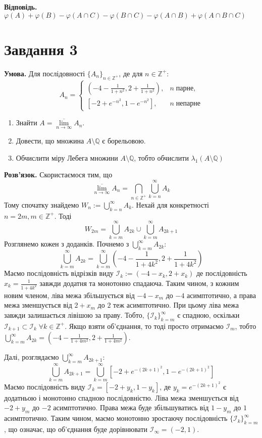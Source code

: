 \documentclass[14pt]{extarticle}
\begin{document}
\textbf{Відповідь.} $\varphi(A)+\varphi(B) - \varphi(A \cap C) - \varphi(B \cap C) - \varphi (A \cap B) + \varphi(A \cap B \cap C)$

\pagebreak

\section*{Завдання 3}

\textbf{Умова.} Для послідовності $\{A_n\}_{n \in \mathbb{Z}^+}$, де для $n \in \mathbb{Z}^+$:
\[
A_n = \begin{cases}
    \left(-4-\frac{1}{1+n^2},2+\frac{1}{1+n^2}\right),& n \; \text{парне},\\
    \left[-2+e^{-n^2},1-e^{-n^2}\right],& n \; \text{непарне}
\end{cases}
\]
\begin{enumerate}
    \item Знайти $A = \underset{n \to \infty}{\overline{\lim}} A_n$.
    \item Довести, що множина $A \setminus \mathbb{Q}$ є борельовою.
    \item Обчислити міру Лебега множини $A \setminus \mathbb{Q}$, тобто обчислити $\lambda_1(A\setminus \mathbb{Q})$
\end{enumerate}

\textbf{Розв'язок.} Скористаємося тим, що
\[
\underset{n \to \infty}{\overline{\lim}} A_n = \bigcap_{n\in\mathbb{Z}^+}\bigcup_{k=n}^{\infty}A_k
\]
Тому спочатку знайдемо $W_n := \bigcup_{k=n}^{\infty}A_k$. Нехай для конкретності $n=2m, m \in \mathbb{Z}^+$. Тоді
\[
W_{2m} = \bigcup_{k=m}^{\infty} A_{2k} \cup \bigcup_{k=m}^{\infty}A_{2k+1}
\]
Розглянемо кожен з доданків. Почнемо з $\bigcup_{k=m}^{\infty}A_{2k}$:
\[
\bigcup_{k=m}^{\infty}A_{2k} = \bigcup_{k=m}^{\infty}\left(-4-\frac{1}{1+4k^2},2+\frac{1}{1+4k^2}\right)
\]
Маємо послідовність відрізків виду $\mathcal{I}_k:=(-4-x_k,2+x_k)$ де послідовність $x_k=\frac{1}{1+4k^2}$ завжди додатня та монотонно спадаюча. Таким чином, з кожним новим членом, ліва межа збільшується від $-4-x_m$ до $-4$ асимптотично, а права межа зменшується від $2+x_m$ до $2$ теж асимптотично. При цьому ліва межа завжди залишається лівішою за праву. Тобто, $\{\mathcal{I}_k\}_{k=m}^{\infty}$ є спадною, оскільки $\mathcal{I}_{k+1} \subset \mathcal{I}_k \; \forall k \in \mathbb{Z}^+$. Якщо взяти об'єднання, то тоді просто отримаємо $\mathcal{I}_m$, тобто $\bigcup_{k=m}^{\infty}A_{2k} = \left(-4-\frac{1}{1+4m^2},2+\frac{1}{1+4m^2}\right)$.

Далі, розглядаємо $\bigcup_{k=m}^{\infty}A_{2k+1}$:
\[
\bigcup_{k=m}^{\infty}A_{2k+1} = \bigcup_{k=m}^{\infty}[-2+e^{-(2k+1)^2}, 1-e^{-(2k+1)^2}]
\]
Маємо послідовність виду $\mathcal{I}_k = [-2+y_k,1-y_k]$, де $y_k=e^{-(2k+1)^2}$ є додатньою і монотонно спадною послідовністю. Ліва межа зменшується від $-2+y_m$ до $-2$ асимптотично. Права межа буде збільшуватись від $1-y_m$ до $1$ асимптотично. Таким чином, маємо монотонно зростаючу послідовність $\{\mathcal{I}_k\}_{k=m}^{\infty}$, що означає, що об'єднання буде дорівнювати $\mathcal{I}_{\infty} = (-2,1)$.
\end{document}
